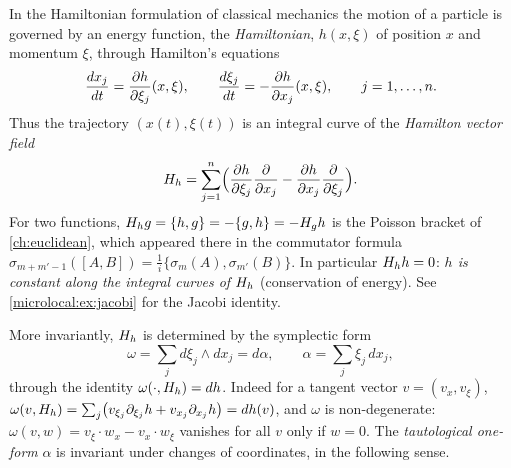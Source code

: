 In the Hamiltonian formulation of classical mechanics the motion of a
particle is governed by an energy function, the \emph{Hamiltonian},
$h(x,\xi)$ of position $x$ and momentum $\xi$, through Hamilton's equations
\begin{equation}\label{microlocal:eq:hamilton}
  \frac{dx_j}{dt}=\frac{\partial h}{\partial\xi_j}(x,\xi),\qquad
  \frac{d\xi_j}{dt}=-\frac{\partial h}{\partial x_j}(x,\xi),\qquad j=1,\dots,n.
\end{equation}
Thus the trajectory $(x(t),\xi(t))$ is an integral curve of the
\emph{Hamilton vector field}
\begin{equation*}
  H_{h}=\sum_{j=1}^n\Bigl(\frac{\partial h}{\partial\xi_j}\frac{\partial}{\partial x_j}
  -\frac{\partial h}{\partial x_j}\frac{\partial}{\partial\xi_j}\Bigr).
\end{equation*}
For two functions, $H_{h}g=\{h,g\}=-\{g,h\}=-H_{g}h$ is the Poisson bracket
of \cref{ch:euclidean}, which appeared there in the commutator formula
$\sigma_{m+m'-1}([A,B])=\frac1i\{\sigma_m(A),\sigma_{m'}(B)\}$. In particular
$H_{h}h=0$: \emph{$h$ is constant along the integral curves of $H_{h}$}
(conservation of energy). See \cref{microlocal:ex:jacobi} for the Jacobi
identity.

More invariantly, $H_{h}$ is determined by the symplectic form
\begin{equation*}
  \omega=\sum_jd\xi_j\wedge dx_j=d\alpha,\qquad\alpha=\sum_j\xi_j\,dx_j,
\end{equation*}
through the identity $\omega(\cdot,H_{h})=dh$. Indeed for a tangent vector
$v=(v_x,v_\xi)$, $\omega(v,H_{h})=\sum_j\bigl(v_{\xi_j}\partial_{\xi_j}h+v_{x_j}\partial_{x_j}h\bigr)=dh(v)$,
and $\omega$ is non-degenerate: $\omega(v,w)=v_\xi\cdot w_x-v_x\cdot w_\xi$
vanishes for all $v$ only if $w=0$. The \emph{tautological one-form} $\alpha$
is invariant under changes of coordinates, in the following sense.

